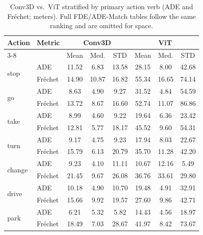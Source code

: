\begin{table}[ht]
\begin{center}
\small
\begin{tabular}{|l|l|ccc|ccc|}
\hline
\multirow{2}{*}{Action} & \multirow{2}{*}{Metric} & \multicolumn{3}{c|}{Conv3D} & \multicolumn{3}{c|}{ViT} \\ \cline{3-8}
 & & Mean & Med. & STD & Mean & Med. & STD \\ \hline
\multirow{2}{*}{stop} & ADE & 11.52 & 6.83 & 13.58 & 28.15 & 8.00 & 42.68 \\
 & Fr\'{e}chet & 14.90 & 10.87 & 16.82 & 55.34 & 16.65 & 74.14 \\ \hline
\multirow{2}{*}{go} & ADE & 8.63 & 4.90 & 9.27 & 31.52 & 4.84 & 54.59 \\
 & Fr\'{e}chet & 13.72 & 8.67 & 16.60 & 52.74 & 11.07 & 86.86 \\ \hline
\multirow{2}{*}{take} & ADE & 8.99 & 4.60 & 9.22 & 19.64 & 6.36 & 23.42 \\
 & Fr\'{e}chet & 12.81 & 5.77 & 18.17 & 45.52 & 9.60 & 54.31 \\ \hline
\multirow{2}{*}{turn} & ADE & 9.17 & 4.75 & 9.23 & 17.94 & 8.03 & 22.67 \\
 & Fr\'{e}chet & 15.79 & 6.13 & 20.79 & 35.70 & 11.28 & 42.20 \\ \hline
\multirow{2}{*}{change} & ADE & 9.23 & 4.10 & 11.11 & 10.67 & 12.16 & 5.49 \\
 & Fr\'{e}chet & 21.45 & 9.67 & 26.08 & 36.76 & 33.61 & 29.80 \\ \hline
\multirow{2}{*}{drive} & ADE & 10.18 & 4.90 & 10.70 & 19.48 & 4.91 & 32.91 \\
 & Fr\'{e}chet & 15.66 & 9.92 & 19.57 & 27.60 & 9.86 & 42.71 \\ \hline
\multirow{2}{*}{park} & ADE & 6.21 & 5.32 & 5.82 & 14.43 & 4.56 & 18.97 \\
 & Fr\'{e}chet & 18.49 & 7.03 & 28.67 & 41.97 & 8.42 & 73.67 \\ \hline
\end{tabular}
\end{center}
\caption{Conv3D vs.\ ViT stratified by primary action verb (ADE and Fr\'{e}chet; meters). Full FDE/ADE-Match tables follow the same ranking and are omitted for space.}
\label{table:action_type}
\end{table}

